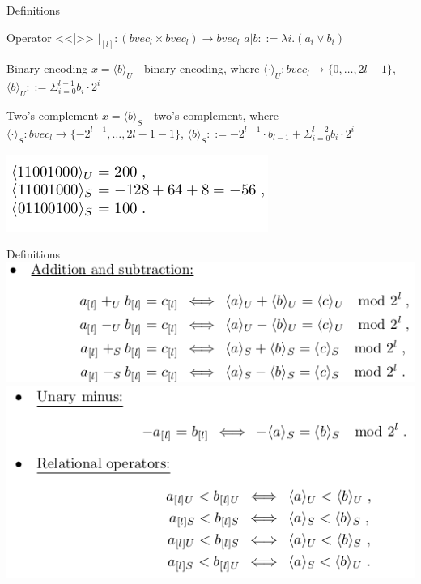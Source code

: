 \documentclass{beamer}
\begin{document}
\begin{frame}{Definitions}
\begin{block}{Operator <<|>>}
$|_{[l]} : (bvec_l \times bvec_l ) \rightarrow bvec_l$\newline
$a | b ::= \lambda i.(a_i \vee b_i)$
\end{block}
\begin{block}{Binary encoding}
$x = \langle b\rangle_U$ - binary encoding, where\newline
$\langle\cdot\rangle_U : bvec_l \rightarrow \{0, \dots, 2l - 1\}$,\newline
$\langle b\rangle_U ::= \Sigma_{i = 0}^{l - 1}b_i\cdot 2^i$
\end{block}
\begin{block}{Two's complement}
$x = \langle b\rangle_S$ - two's complement, where\newline
$\langle\cdot\rangle_S : bvec_l \rightarrow \{-2^{l - 1}, \dots, 2{l-1} - 1\}$,\newline
$\langle b\rangle_S ::= -2^{l-1} \cdot b_{l-1} + \Sigma_{i = 0}^{l - 2}b_i\cdot 2^i$
\end{block}
\includegraphics[scale=0.5]{Binary_encoding.png}\newline
\end{frame}

\begin{frame}{Definitions}
\includegraphics[scale=0.5]{Addition.png}\newline
\includegraphics[scale=0.5]{Unary.png}\newline
\end{frame}
\end{document}
